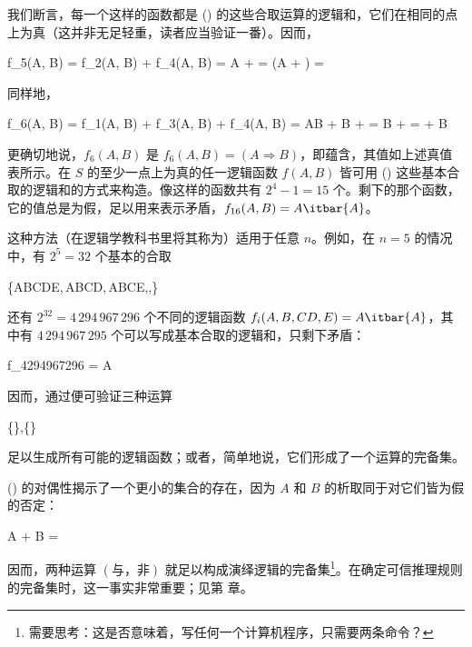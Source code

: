 我们断言，每一个这样的函数都是 (\in[1-17]) 的这些合取运算的逻辑和，它们在相同的点上为真（这并非无足轻重，读者应当验证一番）。因而，

\placeformula
\startformula
\startalign
\NC f_5(A, B) \NC = f_2(A, B) + f_4(A, B)\NR
\NC \NC = A + \NR
\NC \NC = (A + )\NR
\NC \NC = \NR
\stopalign
\stopformula

同样地，

\placeformula
\startformula
\startalign
\NC f_6(A, B) \NC = f_1(A, B) + f_3(A, B) + f_4(A, B)\NR
\NC \NC = AB + B + \NR
\NC \NC = B + \NR
\NC \NC =  + B\NR
\stopalign
\stopformula

更确切地说，$f_6(A, B)$ 是 $f_6(A, B) = (A\Rightarrow B)$，即蕴含，其值如上述真值表所示。在 $S$ 的至少一点上为真的任一逻辑函数 $f(A, B)$ 皆可用 (\in[1-17]) 这些基本合取的逻辑和的方式来构造。像这样的函数共有 $2^4 - 1 = 15$ 个。剩下的那个函数，它的值总是为假，足以用来表示矛盾，$f_{16}(A, B) = A\itbar{A}$。

这种方法（在逻辑学教科书里将其称为）适用于任意 $n$。例如，在 $n = 5$ 的情况中，有 $2^5 = 32$ 个基本的合取

\placeformula
\startformula
\{ABCDE,\,ABCD,\,ABCE,\cdots,\}
\stopformula

还有 $2^{32} = 4\,294\,967\,296$ 个不同的逻辑函数 $f_i(A,B,CD,E) = A\itbar{A}$，其中有 $4\,294\,967\,295$ 个可以写成基本合取的逻辑和，只剩下矛盾：

\placeformula
\startformula
f_{4294967296} = A
\stopformula

因而，通过便可验证三种运算

\placeformula[1-23]
\startformula
\{\},\quad{}\quad \{\}
\stopformula

足以生成所有可能的逻辑函数；或者，简单地说，它们形成了一个运算的完备集。

(\in[1-12]) 的对偶性揭示了一个更小的集合的存在，因为 $A$ 和 $B$ 的析取同于对它们皆为假的否定：

\placeformula
\startformula
A + B = 
\stopformula

因而，两种运算 $(\text{与，非})$ 就足以构成演绎逻辑的完备集\footnote{需要思考：这是否意味着，写任何一个计算机程序，只需要两条命令？}。在确定可信推理规则的完备集时，这一事实非常重要；见第  章。

